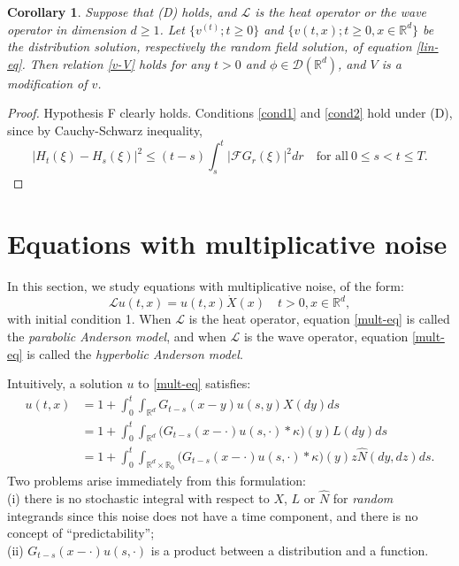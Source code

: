 \documentclass[12pt]{article}
\newtheorem{corollary}[theorem]{Corollary}
\def\cD{\mathcal{D}}
\def\cF{\mathcal{F}}
\def\cL{\mathcal{L}}
\def\bR{\mathbb{R}}
\def\k{\kappa}
\begin{document}
\begin{corollary}
Suppose that  (D) holds, and $\cL$ is the heat operator or the wave operator in dimension $d\geq 1$. Let $\{v^{(t)};t\geq 0\}$ and $\{v(t,x);t\geq 0,x\in \bR^d\}$ be the distribution solution, respectively the random field solution, of equation \eqref{lin-eq}. Then relation \eqref{v-V} holds for any $t>0$ and $\phi \in \cD(\bR^d)$, and $V$ is a modification of $v$.
\end{corollary}


\begin{proof} Hypothesis F clearly holds. Conditions \eqref{cond1} and \eqref{cond2} hold under (D),
since by Cauchy-Schwarz inequality, 
\[
|H_t(\xi)-H_s(\xi)|^2 \leq (t -s) \int_{s}^t |\cF G_r(\xi)|^2 dr \quad \mbox{for all} \ 0\leq s <t \leq T.
\]
\end{proof}













\section{Equations with multiplicative noise}
\label{section-mult} 


In this section, we study equations with multiplicative noise, of the form:
\begin{equation}
\label{mult-eq}
\cL u(t,x)=u(t,x)\dot{X}(x) \quad t>0,x\in \bR^d,
\end{equation}
with initial condition 1. When $\cL$ is the heat operator, equation \eqref{mult-eq} is called the {\em parabolic Anderson model}, and when $\cL$ is the wave operator, equation \eqref{mult-eq} is called the {\em hyperbolic Anderson model}.  

Intuitively, a solution $u$ to \eqref{mult-eq} satisfies:
\begin{align*}
u(t,x)&=1+\int_0^t \int_{\bR^d}G_{t-s}(x-y)u(s,y)X(dy)ds\\
&=1+\int_0^t \int_{\bR^d} \big(G_{t-s}(x-\cdot)u(s,\cdot)*\k\big)(y) L(dy)ds\\
&=1+\int_0^t \int_{\bR^d \times \bR_0} \big(G_{t-s}(x-\cdot)u(s,\cdot)*\k \big)(y) z \widehat{N}(dy,dz)ds.
\end{align*}
Two problems arise immediately from this formulation: \\
(i) there is no stochastic integral with respect to $X$, $L$ or $\widehat{N}$ for {\em random} integrands since this noise does not have a time component, and there is no concept of ``predictability''; \\
(ii) $G_{t-s}(x-\cdot)u(s,\cdot)$ is a product between a distribution and a function. 
\end{document}
